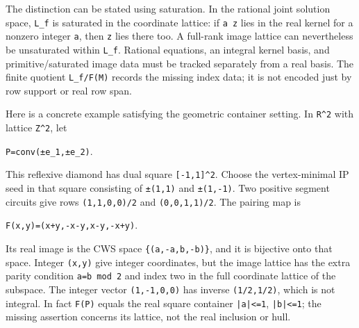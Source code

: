 \documentclass[11pt,a4paper,oneside]{report}
\begin{document}
The distinction can be stated using saturation. In the rational joint
solution space, \texttt{L\_\allowbreak{}f} is saturated in the
coordinate lattice: if \texttt{a z} lies in the real kernel for a
nonzero integer \texttt{a}, then \texttt{z} lies there too. A full-rank
image lattice can nevertheless be unsaturated within
\texttt{L\_\allowbreak{}f}. Rational equations, an integral kernel
basis, and primitive/saturated image data must be tracked separately
from a real basis. The finite quotient
\texttt{L\_\allowbreak{}f/\allowbreak{}F(\allowbreak{}M)} records the
missing index data; it is not encoded just by row support or real row
span.

Here is a concrete example satisfying the geometric container setting.
In \texttt{R\textasciicircum{}2} with lattice
\texttt{Z\textasciicircum{}2}, let

\texttt{P=\allowbreak{}conv(\allowbreak{}±e\_\allowbreak{}1,\allowbreak{}±e\_\allowbreak{}2)}.

This reflexive diamond has dual square
\texttt{[\allowbreak{}-\allowbreak{}1,\allowbreak{}1]\allowbreak{}\textasciicircum{}2}.
Choose the vertex-minimal IP seed in that square consisting of
\texttt{±(\allowbreak{}1,\allowbreak{}1)} and
\texttt{±(\allowbreak{}1,\allowbreak{}-\allowbreak{}1)}. Two positive
segment circuits give rows
\texttt{(\allowbreak{}1,\allowbreak{}1,\allowbreak{}0,\allowbreak{}0)\allowbreak{}/\allowbreak{}2}
and
\texttt{(\allowbreak{}0,\allowbreak{}0,\allowbreak{}1,\allowbreak{}1)\allowbreak{}/\allowbreak{}2}.
The pairing map is

\texttt{F(\allowbreak{}x,\allowbreak{}y)\allowbreak{}=\allowbreak{}(\allowbreak{}x+y,\allowbreak{}-\allowbreak{}x-\allowbreak{}y,\allowbreak{}x-\allowbreak{}y,\allowbreak{}-\allowbreak{}x+y)}.

Its real image is the CWS space
\texttt{\{(\allowbreak{}a,\allowbreak{}-\allowbreak{}a,\allowbreak{}b,\allowbreak{}-\allowbreak{}b)\allowbreak{}\}},
and it is bijective onto that space. Integer
\texttt{(\allowbreak{}x,\allowbreak{}y)} give integer coordinates, but
the image lattice has the extra parity condition
\texttt{a=\allowbreak{}b mod 2} and index two in the full coordinate
lattice of the subspace. The integer vector
\texttt{(\allowbreak{}1,\allowbreak{}-\allowbreak{}1,\allowbreak{}0,\allowbreak{}0)}
has inverse
\texttt{(\allowbreak{}1/\allowbreak{}2,\allowbreak{}1/\allowbreak{}2)},
which is not integral. In fact \texttt{F(\allowbreak{}P)} equals the
real square container \texttt{|a|<=\allowbreak{}1},
\texttt{|b|<=\allowbreak{}1}; the missing assertion concerns its
lattice, not the real inclusion or hull.
\end{document}

